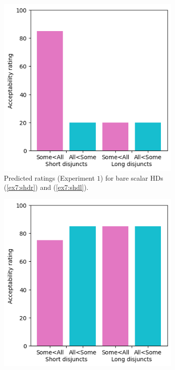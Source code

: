 \begin{figure}[H]
	\centering
	\begin{subfigure}[t]{.32\linewidth}
		\centering
		\includegraphics[width=\linewidth]{./images/pred-2-noonly.png}
		\caption[]{Predicted ratings (Experiment $1$) for bare scalar HDs (\ref{ex7:shdr}) and (\ref{ex7:shdl}).}
	\end{subfigure}
	\hfill
	\begin{subfigure}[t]{.32\linewidth}
		\centering
		\includegraphics[width=\linewidth]{./images/pred-2-only.png}

\end{subfigure}
\end{figure}
